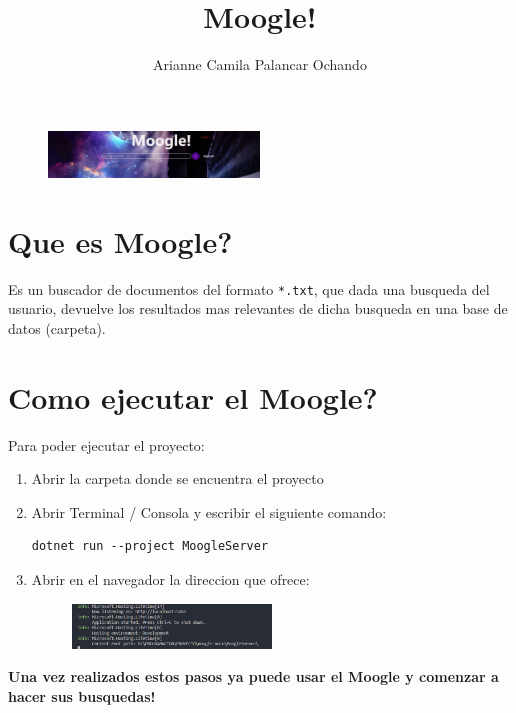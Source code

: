 \documentclass{article}
\title  {\Huge\bfseries Moogle!}
\author{Arianne Camila Palancar Ochando}
\begin{document}
\maketitle

\begin{figure}[h!]
\centering
\includegraphics[width=0.5\textwidth]{../Informe/photos/Img_1.jpg}
\end{figure}

\section{Que es Moogle?}

Es un buscador de documentos del formato \texttt{*.txt}, que dada una busqueda del usuario, devuelve los resultados mas relevantes de dicha busqueda en una base de datos (carpeta).

\section{Como ejecutar el Moogle?}

Para poder ejecutar el proyecto:

\begin{enumerate}
\item Abrir la carpeta donde se encuentra el proyecto
\item Abrir Terminal / Consola y escribir el siguiente comando:

\begin{verbatim}
dotnet run --project MoogleServer  
\end{verbatim}

\item Abrir en el navegador la direccion que ofrece:

\begin{figure}[h!]
\centering
\includegraphics[width=0.5\textwidth]{../Informe/photos/image_2.png}
\end{figure}

\end{enumerate}

\textbf{Una vez realizados estos pasos ya puede usar el Moogle y comenzar a hacer sus busquedas!}
\end{document}
